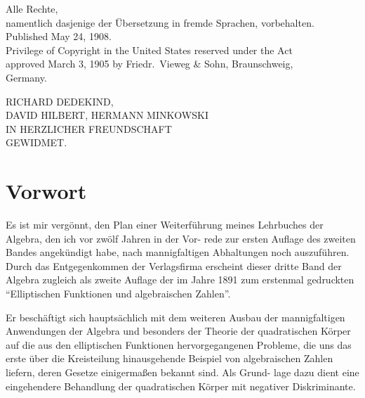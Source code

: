 \documentclass[12pt,a4paper]{book}
\theoremstyle{definition}
\begin{document}
\thispagestyle{empty}
\begin{center}
\vspace*{5cm}

Alle Rechte,\\
namentlich dasjenige der \"Ubersetzung in fremde Sprachen, vorbehalten.\\[2cm]

{\small Published May 24, 1908.\\
Privilege of Copyright in the United States reserved under the Act\\
approved March 3, 1905 by Friedr.\ Vieweg \& Sohn, Braunschweig,\\
Germany.}

\end{center}
\cleardoublepage

\thispagestyle{empty}
\begin{center}
\vspace*{5cm}

{\Large\scshape RICHARD DEDEKIND,\\[0.5em]
DAVID HILBERT, HERMANN MINKOWSKI\\[1.5em]
IN HERZLICHER FREUNDSCHAFT\\[0.5em]
GEWIDMET.}

\end{center}
\cleardoublepage

\chapter*{Vorwort}

Es ist mir verg\"onnt, den Plan einer Weiterf\"uhrung meines
Lehrbuches der Algebra, den ich vor zw\"olf Jahren in der Vor-
rede zur ersten Auflage des zweiten Bandes angek\"undigt habe,
nach mannigfaltigen Abhaltungen noch auszuf\"uhren. Durch das
Entgegenkommen der Verlagsfirma erscheint dieser dritte Band
der Algebra zugleich als zweite Auflage der im Jahre 1891 zum
erstenmal gedruckten ``Elliptischen Funktionen und algebraischen
Zahlen''.

Er besch\"aftigt sich haupts\"achlich mit dem weiteren Ausbau
der mannigfaltigen Anwendungen der Algebra und besonders der
Theorie der quadratischen K\"orper auf die aus den elliptischen
Funktionen hervorgegangenen Probleme, die uns das erste \"uber
die Kreisteilung hinausgehende Beispiel von algebraischen Zahlen
liefern, deren Gesetze einigerma\ss en bekannt sind. Als Grund-
lage dazu dient eine eingehendere Behandlung der quadratischen
K\"orper mit negativer Diskriminante.
\end{document}
